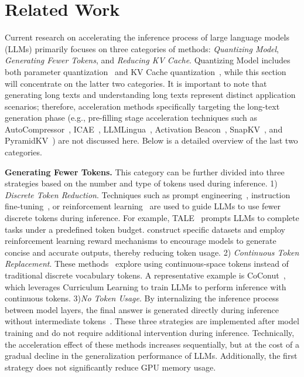 \section{Related Work}
\label{sec:app:related_work}

Current research on accelerating the inference process of large language models (LLMs) primarily focuses on three categories of methods: \textit{Quantizing Model}, \textit{Generating Fewer Tokens}, and \textit{Reducing KV Cache}. 
Quantizing Model includes both parameter quantization~\cite{mlsys24_awq,nips22_8bit} and KV Cache quantization~\citep{icml24_kivi,nips24_kvquant}, while this section will concentrate on the latter two categories. 
It is important to note that generating long texts and understanding long texts represent distinct application scenarios; 
therefore, acceleration methods specifically targeting the long-text generation phase (e.g., pre-filling stage acceleration techniques such as AutoCompressor~\citep{emnlp23_autocompressors}, ICAE~\citep{iclr24_icae}, LLMLingua~\citep{emnlp23_llmlingua}, Activation Beacon~\citep{iclr25_activation_beacon}, SnapKV~\citep{nips24_snapkv}, and PyramidKV~\citep{arxiv24_pyramidkv}) are not discussed here. 
Below is a detailed overview of the last two categories.

\textbf{Generating Fewer Tokens.}
This category can be further divided into three strategies based on the number and type of tokens used during inference.
1) \textit{Discrete Token Reduction}. 
Techniques such as prompt engineering~\citep{arxiv24_tale,arxiv24_break_the_chain,arxiv24_concise_thoughts}, instruction fine-tuning~\citep{nips24_skip_steps,arxiv24_c3ot}, or reinforcement learning~\citep{arxiv25_related_work_rl1,arxiv25_o1_pruner} are used to guide LLMs to use fewer discrete tokens during inference.
For example, TALE~\citep{arxiv24_tale} prompts LLMs to complete tasks under a predefined token budget. 
\citeauthor{arxiv25_related_work_rl1} construct specific datasets and employ reinforcement learning reward mechanisms to encourage models to generate concise and accurate outputs, thereby reducing token usage.
2) \textit{Continuous Token Replacement}.
These methods~\citep{arxiv24_coconut,arxiv24_ccot} explore using continuous-space tokens instead of traditional discrete vocabulary tokens. 
A representative example is CoConut~\citep{arxiv24_coconut}, which leverages Curriculum Learning to train LLMs to perform inference with continuous tokens.
3)\textit{No Token Usage}.
By internalizing the inference process between model layers, the final answer is generated directly during inference without intermediate tokens~\citep{arxiv24_icot,arxiv23_kd_cot}.
These three strategies are implemented after model training and do not require additional intervention during inference. 
Technically, the acceleration effect of these methods increases sequentially, but at the cost of a gradual decline in the generalization performance of LLMs. 
Additionally, the first strategy does not significantly reduce GPU memory usage.

